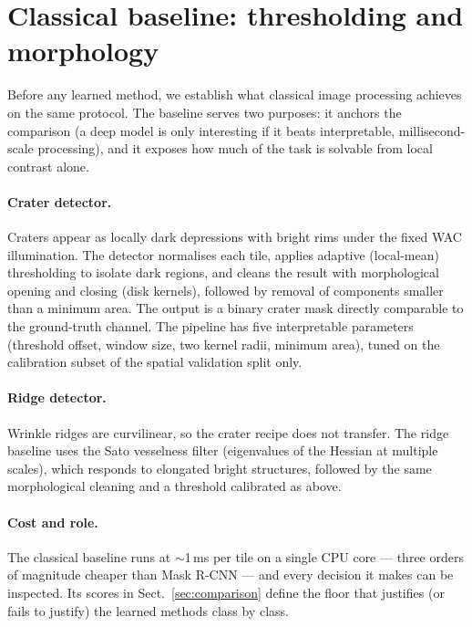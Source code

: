 \section{Classical baseline: thresholding and morphology}
\label{sec:classical}

Before any learned method, we establish what classical image processing achieves on the same protocol. The baseline serves two purposes: it anchors the comparison (a deep model is only interesting if it beats interpretable, millisecond-scale processing), and it exposes how much of the task is solvable from local contrast alone.

\paragraph{Crater detector.}
Craters appear as locally dark depressions with bright rims under the fixed WAC illumination. The detector normalises each tile, applies adaptive (local-mean) thresholding to isolate dark regions, and cleans the result with morphological opening and closing (disk kernels), followed by removal of components smaller than a minimum area. The output is a binary crater mask directly comparable to the ground-truth channel. The pipeline has five interpretable parameters (threshold offset, window size, two kernel radii, minimum area), tuned on the calibration subset of the spatial validation split only.

\paragraph{Ridge detector.}
Wrinkle ridges are curvilinear, so the crater recipe does not transfer. The ridge baseline uses the Sato vesselness filter (eigenvalues of the Hessian at multiple scales), which responds to elongated bright structures, followed by the same morphological cleaning and a threshold calibrated as above.

\paragraph{Cost and role.}
The classical baseline runs at $\sim$1\,ms per tile on a single CPU core --- three orders of magnitude cheaper than Mask R-CNN --- and every decision it makes can be inspected. Its scores in Sect.~\ref{sec:comparison} define the floor that justifies (or fails to justify) the learned methods class by class.
